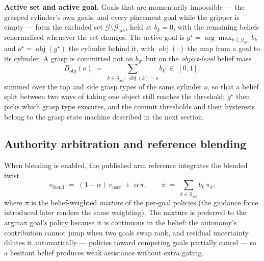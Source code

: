 \textbf{Active set and active goal.} Goals that are momentarily impossible --- the grasped cylinder's own goals, and every placement goal while the gripper is empty --- form the excluded set $\mathcal{G} \setminus \mathcal{G}_{\text{act}}$, held at $b_k = 0$, with the remaining beliefs renormalised whenever the set changes. The active goal is $g^{\star} = \arg\max_{k \in \mathcal{G}_{\text{act}}} b_k$ and $o^{\star} = \operatorname{obj}(g^{\star})$ the cylinder behind it, with $\operatorname{obj}(\cdot)$ the map from a goal to its cylinder. A grasp is committed not on $b_{g^{\star}}$ but on the \emph{object-level} belief mass
\begin{equation}
B_{\text{obj}}(o) \;=\; \sum_{k \in \mathcal{G}_{\text{act}}:\; \operatorname{obj}(k) = o} b_k \;\in\; [0,1],
\label{eq:objbelief}
\end{equation}
summed over the top and side grasp types of the same cylinder $o$, so that a belief split between two ways of taking one object still reaches the threshold; $g^{\star}$ then picks which grasp type executes, and the commit thresholds and their hysteresis belong to the grasp state machine described in the next section.

\subsection{Authority arbitration and reference blending}
\label{sec:blend}

When blending is enabled, the published arm reference integrates the blended twist~\cite{dragan2013policy}
\begin{equation}
v_{\text{blend}} \;=\; (1-\alpha)\,v_{\text{user}} \;+\; \alpha\,\bar{\pi},
\qquad
\bar{\pi} \;=\; \sum_{k \in \mathcal{G}_{\text{act}}} b_k\,\pi_k,
\label{eq:blend}
\end{equation}
where $\bar{\pi}$ is the belief-weighted \emph{mixture} of the per-goal policies (the guidance force introduced later renders the same weighting). The mixture is preferred to the argmax goal's policy because it is continuous in the belief: the autonomy's contribution cannot jump when two goals swap rank, and residual uncertainty dilutes it automatically --- policies toward competing goals partially cancel --- so a hesitant belief produces weak assistance without extra gating.

